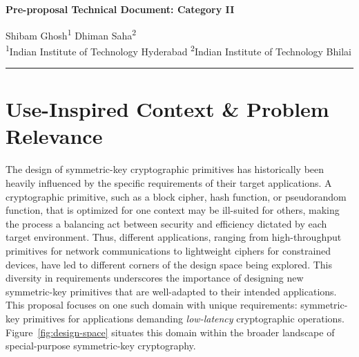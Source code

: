 
\newcommand{\soptitle}{Pre-proposal Technical Document: Category II}

\begin{center}
\vspace*{-0.8cm}
{\sffamily\bfseries\Large \textcolor{theme}{\soptitle}}\par
\vspace{2pt}
Shibam Ghosh\textsuperscript{1} \quad Dhiman Saha\textsuperscript{2} \\[1ex]
\small \textsuperscript{1}Indian Institute of Technology Hyderabad
  \small \textsuperscript{2}Indian Institute of Technology Bhilai \\[1ex]
\vspace{8pt}
\hrule
\end{center}

\section{Use-Inspired Context \& Problem Relevance}

The design of symmetric-key cryptographic primitives has historically been heavily influenced by the specific requirements of their target applications.
A cryptographic primitive, such as a block cipher, hash function, or pseudorandom function, that is optimized for one context may be ill-suited for others, making the process a balancing act between security and efficiency dictated by each target environment.
Thus, different applications, ranging from high-throughput primitives for network communications to lightweight ciphers for constrained devices, have led to different corners of the design space being explored.
This diversity in requirements underscores the importance of designing new symmetric-key primitives that are well-adapted to their intended applications.
This proposal focuses on one such domain with unique requirements: symmetric-key primitives for applications demanding \emph{low-latency} cryptographic operations.
Figure~\ref{fig:design-space} situates this domain within the broader landscape of special-purpose symmetric-key cryptography.

